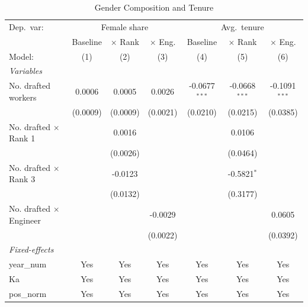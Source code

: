 \begin{table}[htbp]
\centering
\caption{Gender Composition and Tenure}
\label{tab:gender}
\small
\begin{threeparttable}
\begin{tabular}{lcccccc}
\midrule Dep.\ var: & \multicolumn{3}{c}{Female share} & \multicolumn{3}{c}{Avg.\ tenure} \\
                                  & Baseline & $\times$ Rank  & $\times$ Eng.  & Baseline        & $\times$ Rank   & $\times$ Eng. \\    
   Model:                         & (1)      & (2)            & (3)            & (4)             & (5)             & (6)\\  
   \midrule
   \emph{Variables}\\
   No. drafted workers            & 0.0006   & 0.0005         & 0.0026         & -0.0677$^{***}$ & -0.0668$^{***}$ & -0.1091$^{***}$\\   
                                  & (0.0009) & (0.0009)       & (0.0021)       & (0.0210)        & (0.0215)        & (0.0385)\\   
   No. drafted $\times$ Rank 1    &          & 0.0016         &                &                 & 0.0106          &   \\   
                                  &          & (0.0026)       &                &                 & (0.0464)        &   \\   
   No. drafted $\times$ Rank 3    &          & -0.0123        &                &                 & -0.5821$^{*}$   &   \\   
                                  &          & (0.0132)       &                &                 & (0.3177)        &   \\   
   No. drafted $\times$ Engineer  &          &                & -0.0029        &                 &                 & 0.0605\\   
                                  &          &                & (0.0022)       &                 &                 & (0.0392)\\   
   \midrule
   \emph{Fixed-effects}\\
   year\_num                      & Yes      & Yes            & Yes            & Yes             & Yes             & Yes\\  
   Ka                             & Yes      & Yes            & Yes            & Yes             & Yes             & Yes\\  
   pos\_norm                      & Yes      & Yes            & Yes            & Yes             & Yes             & Yes\\  

\end{tabular}
\end{threeparttable}
\end{table}
